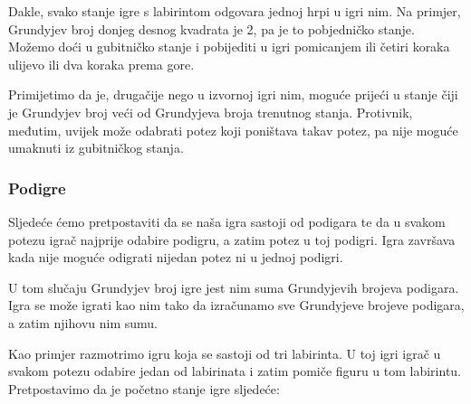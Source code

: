 Dakle, svako stanje igre s labirintom
odgovara jednoj hrpi u igri nim.
Na primjer, Grundyjev broj
donjeg desnog kvadrata je 2,
pa je to pobjedničko stanje.
Možemo doći u gubitničko stanje i
pobijediti u igri pomicanjem
ili četiri koraka ulijevo ili
dva koraka prema gore.

Primijetimo da je, drugačije nego u izvornoj igri nim,
moguće prijeći u stanje čiji je
Grundyjev broj veći od Grundyjeva broja
trenutnog stanja.
Protivnik, međutim, uvijek može odabrati potez
koji poništava takav potez, pa nije moguće
umaknuti iz gubitničkog stanja.

\subsubsection{Podigre}

Sljedeće ćemo pretpostaviti da se naša igra sastoji
od podigara te da u svakom potezu igrač
najprije odabire podigru, a zatim potez u toj podigri.
Igra završava kada nije moguće odigrati nijedan potez
ni u jednoj podigri.

U tom slučaju Grundyjev broj igre
jest nim suma Grundyjevih brojeva podigara.
Igra se može igrati kao nim tako da izračunamo
sve Grundyjeve brojeve podigara, a zatim njihovu nim sumu.

Kao primjer razmotrimo igru koja se sastoji
od tri labirinta.
U toj igri igrač u svakom potezu odabire jedan
od labirinata i zatim pomiče figuru u tom labirintu.
Pretpostavimo da je početno stanje igre sljedeće:

